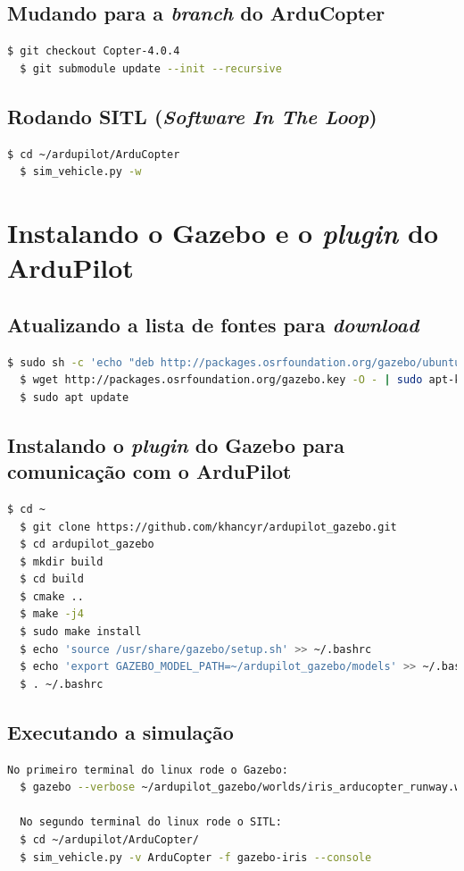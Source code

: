 \documentclass[12pt,a4paper,oneside]{book}
\begin{document}
\subsection{Mudando para a \textit{branch} do ArduCopter}
\begin{lstlisting}[language=bash]
  $ git checkout Copter-4.0.4
  $ git submodule update --init --recursive
\end{lstlisting}

\subsection{Rodando SITL (\textit{Software In The Loop})}
\begin{lstlisting}[language=bash]
  $ cd ~/ardupilot/ArduCopter
  $ sim_vehicle.py -w
\end{lstlisting}

\section{Instalando o Gazebo e o \textit{plugin} do ArduPilot}

\subsection{Atualizando a lista de fontes para \textit{download}}
\begin{lstlisting}[language=bash]
  $ sudo sh -c 'echo "deb http://packages.osrfoundation.org/gazebo/ubuntu-stable `lsb_release -cs` main" > /etc/apt/sources.list.d/gazebo-stable.list'
  $ wget http://packages.osrfoundation.org/gazebo.key -O - | sudo apt-key add -
  $ sudo apt update
\end{lstlisting}

\subsection{Instalando o \textit{plugin} do Gazebo para comunicação com o ArduPilot}
\begin{lstlisting}[language=bash]
  $ cd ~
  $ git clone https://github.com/khancyr/ardupilot_gazebo.git
  $ cd ardupilot_gazebo
  $ mkdir build
  $ cd build
  $ cmake ..
  $ make -j4
  $ sudo make install
  $ echo 'source /usr/share/gazebo/setup.sh' >> ~/.bashrc
  $ echo 'export GAZEBO_MODEL_PATH=~/ardupilot_gazebo/models' >> ~/.bashrc
  $ . ~/.bashrc
\end{lstlisting}

\subsection{Executando a simulação}
\begin{lstlisting}[language=bash]
  No primeiro terminal do linux rode o Gazebo: 
  $ gazebo --verbose ~/ardupilot_gazebo/worlds/iris_arducopter_runway.world
  
  No segundo terminal do linux rode o SITL:
  $ cd ~/ardupilot/ArduCopter/
  $ sim_vehicle.py -v ArduCopter -f gazebo-iris --console
\end{lstlisting}
\end{document}
